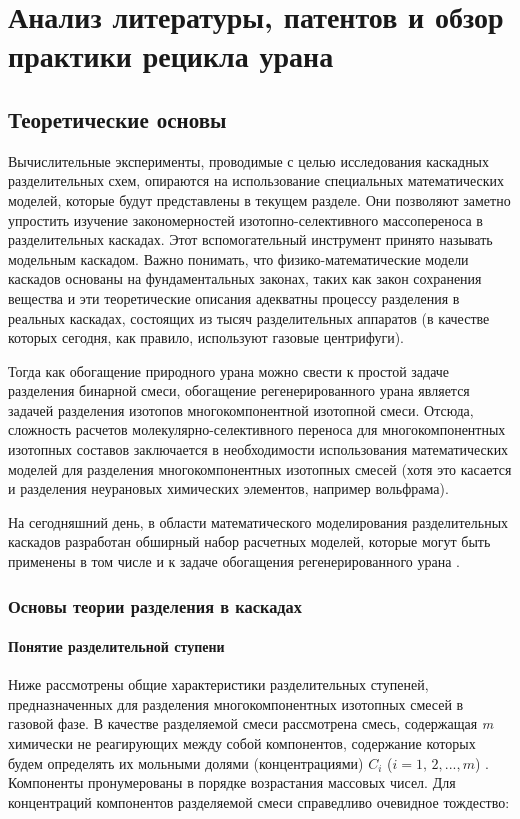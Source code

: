 \chapter{Анализ литературы, патентов и обзор практики рецикла урана}\label{ch1}

\section{Теоретические основы}

Вычислительные эксперименты, проводимые с целью исследования каскадных разделительных схем, опираются на использование специальных математических моделей, которые будут представлены в текущем разделе. Они позволяют заметно упростить изучение закономерностей изотопно-селективного массопереноса в разделительных каскадах. Этот вспомогательный инструмент принято называть модельным каскадом.
Важно понимать, что физико-математические модели каскадов основаны на фундаментальных законах, таких как закон сохранения вещества и эти теоретические описания адекватны процессу разделения в реальных каскадах, состоящих из тысяч разделительных аппаратов (в качестве которых сегодня, как правило, используют газовые центрифуги).

Тогда как обогащение природного урана можно свести к простой задаче разделения бинарной смеси, обогащение регенерированного урана является задачей разделения изотопов многокомпонентной изотопной смеси. Отсюда, сложность расчетов молекулярно-селективного переноса для многокомпонентных изотопных составов заключается в необходимости использования математических моделей для разделения многокомпонентных изотопных смесей (хотя это касается и разделения неурановых химических элементов, например вольфрама).

На сегодняшний день, в области математического моделирования разделительных каскадов разработан обширный набор расчетных моделей, которые могут быть применены в том числе и к задаче обогащения регенерированного урана \cite{smirnovMolekulyarnoselektivnyyMassoperenosKomponentov2013}.

\subsection{Основы теории разделения в каскадах}
\subsubsection{Понятие разделительной ступени}
Ниже рассмотрены общие характеристики разделительных ступеней, предназначенных для разделения многокомпонентных изотопных смесей в газовой фазе. В качестве разделяемой смеси рассмотрена смесь, содержащая \textit{m} химически не реагирующих между собой компонентов, содержание которых будем определять их мольными долями (концентрациями) $C_{i}$ ($i=1,\, 2,...,m$) \cite{sulaberidzeTeoriyaKaskadovDlya2011}. Компоненты пронумерованы в порядке возрастания массовых чисел. Для концентраций компонентов разделяемой смеси справедливо очевидное тождество:

